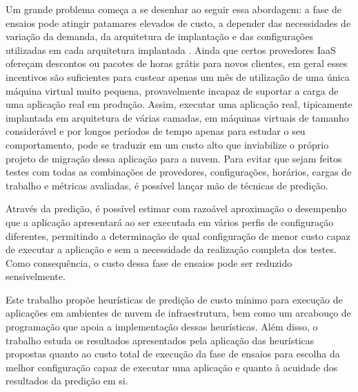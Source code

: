 Um grande problema começa a se desenhar ao seguir essa abordagem: a fase de ensaios pode atingir 
patamares elevados de custo, a depender das necessidades de variação da demanda, da arquitetura 
de implantação e das configurações utilizadas em cada arquitetura implantada 
\cite{silva2013cloudbench}. Ainda que certos provedores IaaS ofereçam descontos ou pacotes de 
horas grátis para novos clientes, em geral esses incentivos são suficientes para custear apenas 
um mês de utilização de uma única máquina virtual muito pequena, provavelmente incapaz de suportar 
a carga de uma aplicação real em produção. Assim, executar uma aplicação real, tipicamente 
implantada em arquitetura de várias camadas, em máquinas virtuais de tamanho considerável e por 
longos períodos de tempo apenas para estudar o seu comportamento, pode se traduzir em um custo 
alto que inviabilize o próprio projeto de migração dessa aplicação para a nuvem. Para evitar 
que sejam feitos testes com todas as combinações de provedores, configurações, horários, cargas 
de trabalho e métricas avaliadas, é possível lançar mão de técnicas de predição.

Através da predição, é possível estimar com razoável aproximação o desempenho que a aplicação 
apresentará ao ser executada em vários perfis de configuração diferentes, permitindo a 
determinação de qual configuração de menor custo capaz de executar a aplicação e sem a 
necessidade da realização completa dos testes. Como consequência, o custo dessa fase de 
ensaios pode ser reduzido sensivelmente.

Este trabalho propõe heurísticas de predição de custo mínimo para execução de aplicações 
em ambientes de nuvem de infraestrutura, bem como um arcabouço de programação que apoia a 
implementação dessas heurísticas. Além disso, o trabalho estuda os resultados apresentados 
pela aplicação das heurísticas propostas quanto ao custo total de execução da fase de ensaios 
para escolha da melhor configuração capaz de executar uma aplicação e quanto à acuidade dos 
resultados da predição em si.
